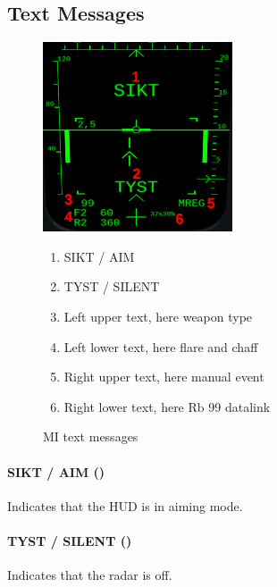 \subsection{Text Messages}
\begin{figure}[!ht]
  \centering
  \includegraphics[width=0.5\textwidth]{images/displays/MI-text.png}

  \begin{multicols}{2}
    \begin{enumerate}[nosep]
      \item \label{item:text-sikt} SIKT / AIM
      \item \label{item:text-tyst} TYST / SILENT
      \item \label{item:text-bl1} Left upper text, here weapon type
      \item \label{item:text-bl2} Left lower text, here flare and chaff
      \item \label{item:text-br1} Right upper text, here manual event
      \item \label{item:text-br2} Right lower text, here Rb 99 datalink
    \end{enumerate}
  \end{multicols}

  \caption{MI text messages}
  \label{fig:mi-text}
\end{figure}


\paragraph{SIKT / AIM ()}
Indicates that the HUD is in aiming mode.

\paragraph{TYST / SILENT ()}
Indicates that the radar is off.

